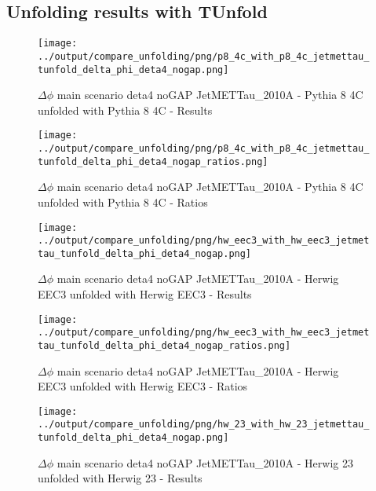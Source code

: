 \documentclass[11pt]{book}
\begin{document}
\clearpage
\subsection{Unfolding results with TUnfold}

\begin{figure}[ht]
\centering
\texttt{[image: ../output/compare\_unfolding/png/p8\_4c\_with\_p8\_4c\_jetmettau\_tunfold\_delta\_phi\_deta4\_nogap.png]}
\caption{$\Delta\phi$ main scenario deta4 noGAP JetMETTau\_2010A - Pythia 8 4C unfolded with Pythia 8 4C - Results}
\label{p8_p8_jetmettau_tunfold_delta_phi_deta4_nogap_a}
\end{figure}

\begin{figure}[ht]
\centering
\texttt{[image: ../output/compare\_unfolding/png/p8\_4c\_with\_p8\_4c\_jetmettau\_tunfold\_delta\_phi\_deta4\_nogap\_ratios.png]}
\caption{$\Delta\phi$ main scenario deta4 noGAP JetMETTau\_2010A - Pythia 8 4C unfolded with Pythia 8 4C - Ratios}
\label{p8_p8_jetmettau_tunfold_delta_phi_deta4_nogap_b}
\end{figure}

\begin{figure}[ht]
\centering
\texttt{[image: ../output/compare\_unfolding/png/hw\_eec3\_with\_hw\_eec3\_jetmettau\_tunfold\_delta\_phi\_deta4\_nogap.png]}
\caption{$\Delta\phi$ main scenario deta4 noGAP JetMETTau\_2010A - Herwig EEC3 unfolded with Herwig EEC3 - Results}
\label{hw_eec3_hw_eec3_jetmettau_tunfold_delta_phi_deta4_nogap_a}
\end{figure}

\begin{figure}[ht]
\centering
\texttt{[image: ../output/compare\_unfolding/png/hw\_eec3\_with\_hw\_eec3\_jetmettau\_tunfold\_delta\_phi\_deta4\_nogap\_ratios.png]}
\caption{$\Delta\phi$ main scenario deta4 noGAP JetMETTau\_2010A - Herwig EEC3 unfolded with Herwig EEC3 - Ratios}
\label{hw_eec3_hw_eec3_jetmettau_tunfold_delta_phi_deta4_nogap_b}
\end{figure}

\begin{figure}[ht]
\centering
\texttt{[image: ../output/compare\_unfolding/png/hw\_23\_with\_hw\_23\_jetmettau\_tunfold\_delta\_phi\_deta4\_nogap.png]}
\caption{$\Delta\phi$ main scenario deta4 noGAP JetMETTau\_2010A - Herwig 23 unfolded with Herwig 23 - Results}
\label{hw_23_hw_23_jetmettau_tunfold_delta_phi_deta4_nogap_a}
\end{figure}
\end{document}

